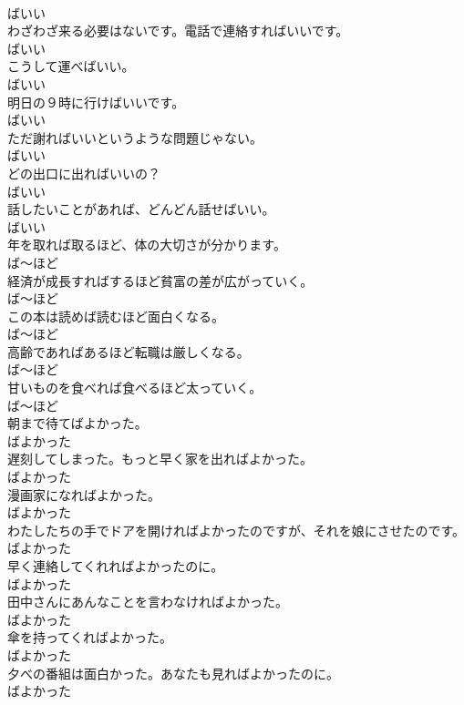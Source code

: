 \documentclass[8pt]{extreport}
\begin{document}
\begin{CJK}{UTF8}{min}
\\	ばいい
\\	わざわざ来る必要はないです。電話で連絡すればいいです。	
\\	ばいい
\\	こうして運べばいい。	
\\	ばいい
\\	明日の９時に行けばいいです。	
\\	ばいい
\\	ただ謝ればいいというような問題じゃない。	
\\	ばいい
\\	どの出口に出ればいいの？	
\\	ばいい
\\	話したいことがあれば、どんどん話せばいい。	
\\	ばいい
\\	年を取れば取るほど、体の大切さが分かります。	
\\	ば～ほど
\\	経済が成長すればするほど貧富の差が広がっていく。	
\\	ば～ほど
\\	この本は読めば読むほど面白くなる。	
\\	ば～ほど
\\	高齢であればあるほど転職は厳しくなる。	
\\	ば～ほど
\\	甘いものを食べれば食べるほど太っていく。	
\\	ば～ほど
\\	朝まで待てばよかった。	
\\	ばよかった
\\	遅刻してしまった。もっと早く家を出ればよかった。	
\\	ばよかった
\\	漫画家になればよかった。	
\\	ばよかった
\\	わたしたちの手でドアを開ければよかったのですが、それを娘にさせたのです。	
\\	ばよかった
\\	早く連絡してくれればよかったのに。	
\\	ばよかった
\\	田中さんにあんなことを言わなければよかった。	
\\	ばよかった
\\	傘を持ってくればよかった。	
\\	ばよかった
\\	夕べの番組は面白かった。あなたも見ればよかったのに。	
\\	ばよかった

\end{CJK}
\end{document}
